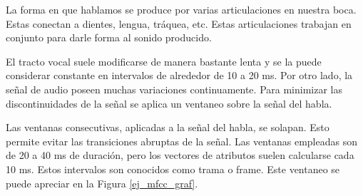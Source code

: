 La forma en que hablamos se produce por varias articulaciones en nuestra boca. Estas conectan a dientes, lengua, tráquea, etc. Estas articulaciones trabajan en conjunto para darle forma al sonido producido. 

El tracto vocal suele modificarse de manera bastante lenta y se la puede considerar constante en intervalos de alrededor de 10 a 20 ms. Por otro lado, la señal de audio poseen muchas variaciones continuamente. Para minimizar las discontinuidades de la señal se aplica un ventaneo sobre la señal del habla. 

Las ventanas consecutivas, aplicadas a la señal del habla, se solapan. Esto permite evitar las transiciones abruptas de la señal. Las ventanas empleadas son de 20 a 40 ms de duración, pero los vectores de atributos suelen calcularse cada 10 ms. Estos intervalos son conocidos como trama o frame. Este ventaneo se puede apreciar en la Figura \ref{ej_mfcc_graf}.

\newcommand{\mfccvec}[3]%
{  
	\node[fill={rgb:black,1;white,2;white,3}, rounded corners, draw, inner sep=+0pt] at (#1,#2) {\tiny \begin{tabular}{c}
		Coef 1\\\hline
		Coef 2\\\hline
		Coef 3\\\hline
		...\\\hline
		Coef N\\
	\end{tabular}};
	\node at (#1, #2-1) {{\tiny #3}};
}

\newcommand{\mfccvecmax}[3]%
{  
	\node[fill={rgb:red,1;white,2;white,3}, rounded corners, draw, inner sep=+0pt] at (#1,#2) {\tiny \begin{tabular}{c}
		Max(T1.coef1, T2.coef1, ... , TM.coef1)\\\hline
		Max(T1.coef2, T2.coef2, ... , TM.coef2)\\\hline
		Max(T1.coef3, T2.coef3, ... , TM.coef3)\\\hline
		...\\\hline
		Max(T1.coefN, T2.coefN, ... , TM.coefN)\\
	\end{tabular}};
	\node at (#1, #2-1) {{\tiny #3}};
}

\newcommand{\intervalo}[2]%
{  
	\draw (#1,#2) -- (#1+0.8,#2);
	\draw (#1,#2-.1) -- (#1, #2+.1);
	\draw (#1+0.8,#2-.1) -- (#1+0.8, #2+.1);

	\draw (#1,#2) -- (#1+.1,#2+.05);
	\draw (#1,#2) -- (#1+.1,#2-.05);

	\draw (#1+0.8,#2) -- (#1+0.8-.1,#2+.05);
	\draw (#1+0.8,#2) -- (#1+0.8-.1,#2-.05);
}

